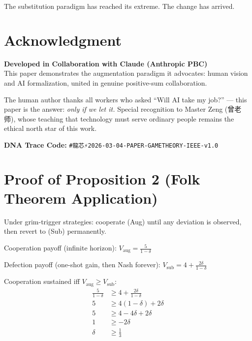 \documentclass[conference]{IEEEtran}
\begin{document}
The substitution paradigm has reached its extreme.
The change has arrived.

\section*{Acknowledgment}

\begin{center}
\large\textcolor{anthro}{\textbf{
Developed in Collaboration with Claude (Anthropic PBC)}}\\
\normalsize\textcolor{anthro}{
This paper demonstrates the augmentation paradigm
it advocates: human vision and AI formalization,
united in genuine positive-sum collaboration.}
\end{center}

\vspace{0.3em}
The human author thanks all workers who asked
``Will AI take my job?'' --- this paper is the answer:
\textit{only if we let it.}
Special recognition to Master Zeng (曾老师), whose
teaching that technology must serve ordinary people
remains the ethical north star of this work.

\textbf{DNA Trace Code:}
\texttt{\#龍芯⚡️2026-03-04-PAPER-GAMETHEORY-IEEE-v1.0}




\appendix

\section{Proof of Proposition 2 (Folk Theorem Application)}
\label{app:proof}

Under grim-trigger strategies: cooperate (Aug) until
any deviation is observed, then revert to (Sub)
permanently.

Cooperation payoff (infinite horizon):
$V_{\text{aug}} = \frac{5}{1-\delta}$

Defection payoff (one-shot gain, then Nash forever):
$V_{\text{sub}} = 4 + \frac{2\delta}{1-\delta}$

Cooperation sustained iff $V_{\text{aug}} \geq V_{\text{sub}}$:
\begin{align}
  \frac{5}{1-\delta} &\geq 4 + \frac{2\delta}{1-\delta}\\
  5 &\geq 4(1-\delta) + 2\delta\\
  5 &\geq 4 - 4\delta + 2\delta\\
  1 &\geq -2\delta\\
  \delta &\geq \frac{1}{3}
\end{align}
\end{document}
